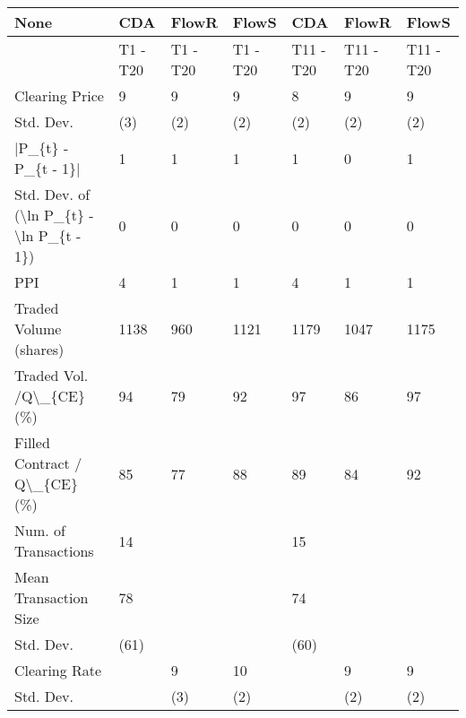 \begin{tabular}{lllllll}
\hline
 None                                                      & CDA      & FlowR    & FlowS    & CDA       & FlowR     & FlowS     \\
\hline
                                                           & T1 - T20 & T1 - T20 & T1 - T20 & T11 - T20 & T11 - T20 & T11 - T20 \\
 Clearing Price                                            & 9        & 9        & 9        & 8         & 9         & 9         \\
 Std. Dev.                                                 & (3)      & (2)      & (2)      & (2)       & (2)       & (2)       \\
 |P\_\{t\} - P\_\{t - 1\}|                                       & 1        & 1        & 1        & 1         & 0         & 1         \\
 Std. Dev. of (\textbackslash{}ln P\_\{t\} - \textbackslash{}ln P\_\{t - 1\})                  & 0        & 0        & 0        & 0         & 0         & 0         \\
 PPI                                                       & 4        & 1        & 1        & 4         & 1         & 1         \\
 Traded Volume (shares)                                    & 1138     & 960      & 1121     & 1179      & 1047      & 1175      \\
 Traded Vol. /Q\textbackslash{}\_\{CE\} (\%)                                  & 94       & 79       & 92       & 97        & 86        & 97        \\
 Filled Contract / Q\textbackslash{}\_\{CE\} (\%)                             & 85       & 77       & 88       & 89        & 84        & 92        \\
 Num. of Transactions                                      & 14       &          &          & 15        &           &           \\
 Mean Transaction Size                                     & 78       &          &          & 74        &           &           \\
 Std. Dev.                                                 & (61)     &          &          & (60)      &           &           \\
 Clearing Rate                                             &          & 9        & 10       &           & 9         & 9         \\
 Std. Dev.                                                 &          & (3)      & (2)      &           & (2)       & (2)       \\

\end{tabular}
